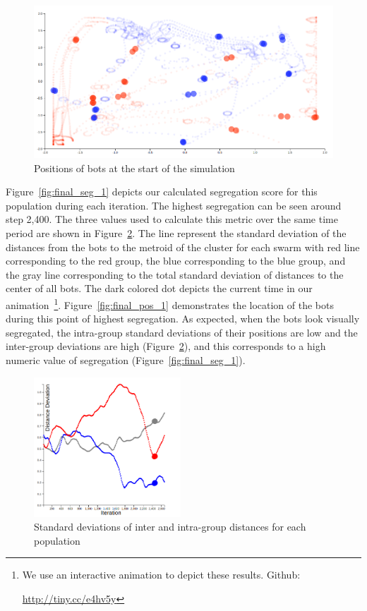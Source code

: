 \begin{figure}
    \centering
    \includegraphics[width=\linewidth]{imgs/init_place_1.png}
    \caption{Positions of bots at the start of the simulation}
    \label{fig:init_pos_1}
\end{figure}

Figure~\ref{fig:final_seg_1} depicts our calculated segregation score for this population during each iteration. 
The highest segregation can be seen around step 2,400. 
The three values used to calculate this metric over the same time period are shown in Figure~\ref{fig:final_dev_1}. 
The line represent the standard deviation of the distances from the bots to the metroid of the cluster for each swarm with red line corresponding to the red group, the blue corresponding to the blue group, and the gray line corresponding to the total standard deviation of distances to the center of all bots. 
The dark colored dot depicts the current time in our animation~\footnote{We use an interactive animation to depict these results. Github:

\url{http://tiny.cc/e4hv5y}}.
Figure~\ref{fig:final_pos_1} demonstrates the location of the bots during this point of highest segregation. 
As expected, when the bots look visually segregated, the intra-group standard deviations of their positions are low and the inter-group deviations are high (Figure~\ref{fig:final_dev_1}), and this corresponds to a high numeric value of segregation (Figure~\ref{fig:final_seg_1}). 

\begin{figure}
    \centering
    \includegraphics[width=5.5cm]{imgs/final_dev_1.png}
    \caption{Standard deviations of inter and intra-group distances for each population}
    \label{fig:final_dev_1}
\end{figure}

